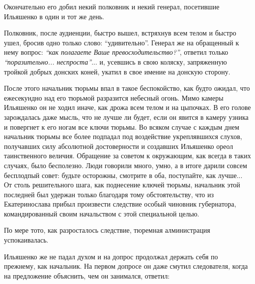 \documentclass[a4paper,20pt]{report}
\begin{document}
Окончательно его добил некий полковник и некий генерал, посетившие Ильяшенко в
один и тот же день.

Полковник, после аудиенции, быстро вышел, встряхнув всем телом и быстро ушел,
бросив одно только слово: ``удивительно''. Генерал же на обращенный к нему
вопрос: \emph{``как полагаете Ваше превосходительство?''}, ответил только
\emph{``поразительно... неспроста''}... и, усевшись в свою коляску, запряженную
тройкой добрых донских коней, укатил в свое имение на донскую сторону.

После этого начальник тюрьмы впал в такое беспокойство, как будто ожидал, что
ежесекундно над его тюрьмой разразится небесный огонь. Мимо камеры Ильяшенко он
не ходил иначе, как дрожа всем телом и на цыпочках.  В его голове зарождалась
даже мысль, что не лучше ли будет, если он явится в камеру узника и повергнет к
его ногам все ключи тюрьмы. Во всяком случае с каждым днем начальник тюрьмы все
более подпадал под воздействие укреплявшихся слухов, получавших силу абсолютной
достоверности и создавших Ильяшенко ореол таинственного величия. Обращение за
советом к окружающим, как всегда в таких случаях, было бесполезно.
Люди говорили много, умно, а в итоге дарили совсем бесплодпый совет: будьте
осторожны, смотрите в оба, поступайте, как лучше... От столь решительного шага,
как поднесение ключей тюрьмы, начальник этой последней был удержан только
благодаря тому обстоятельству, что из Екатеринослава прибыл произвести
следствие особый чиновник губернатора, командированный своим начальством с этой
специальной целью.

По мере тото, как разросталось следствие, тюремная
алминистрация успокаивалась.

Ильяшенко же не падал духом и на допрос продолжал держать себя по прежнему, как начальник.
На первом допросе он даже смутил следователя, когда на предложение объяснить, чем он занимался, ответил:
\end{document}
